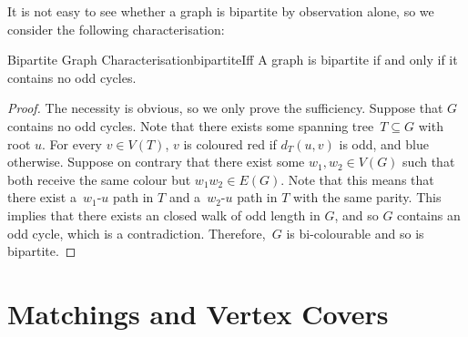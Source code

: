 \documentclass[math]{amznotes}
\theoremstyle{remark}
\newcommand{\0}{\mathbf{0}}
\newcommand{\1}{\mathbf{1}}
\begin{document}
It is not easy to see whether a graph is bipartite by observation alone, so we consider the following characterisation:
\begin{thmbox}{Bipartite Graph Characterisation}{bipartiteIff}
    A graph is bipartite if and only if it contains no odd cycles.
    \tcblower
    \begin{proof}
        The necessity is obvious, so we only prove the sufficiency. Suppose that $G$ contains no odd cycles. Note that there exists some spanning tree~$T \subseteq G$ with root $u$. For every $v \in V(T)$, $v$ is coloured red if $d_T(u, v)$ is odd, and blue otherwise. Suppose on contrary that there exist some $w_1, w_2 \in V(G)$ such that both receive the same colour but $w_1w_2 \in E(G)$. Note that this means that there exist a~$w_1$-$u$ path in $T$ and a~$w_2$-$u$ path in $T$ with the same parity. This implies that there exists an closed walk of odd length in $G$, and so $G$ contains an odd cycle, which is a contradiction. Therefore,~$G$ is bi-colourable and so is bipartite.
    \end{proof}
\end{thmbox}

\chapter{Matchings and Vertex Covers}
\end{document}
